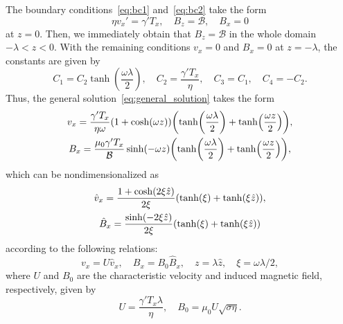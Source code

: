 \documentclass{article}
\begin{document}
The boundary conditions~\eqref{eq:bc1} and~\eqref{eq:bc2} take the form
\begin{equation}\label{eq:bc}
    \eta v_x' = \gamma'T_x, \quad B_z = \mathcal{B}, \quad B_x = 0
\end{equation}
at $z=0$.
Then, we immediately obtain that $B_z=\mathcal{B}$ in the whole domain $-\lambda<z<0$.
With the remaining conditions $v_x=0$ and $B_x=0$ at $z=-\lambda$,
the constants are given by
\begin{equation}\label{eq:constants}
    C_1 = C_2\tanh(\frac{\omega\lambda}2), \quad
    C_2 = \frac{\gamma'T_x}{\eta}, \quad
    C_3 = C_1, \quad C_4 = -C_2.
\end{equation}
Thus, the general solution~\eqref{eq:general_solution} takes the form
\begin{gather}
    v_x = \frac{\gamma'T_x}{\eta\omega}(1+\cosh(\omega z))
        \qty(\tanh(\frac{\omega\lambda}2) + \tanh(\frac{\omega z}2)), \label{eq:v_x}\\
    B_x = \frac{\mu_0\gamma'T_x}{\mathcal{B}}\sinh(-\omega z)
        \qty(\tanh(\frac{\omega\lambda}2) + \tanh(\frac{\omega z}2)), \label{eq:B_x}
\end{gather}
which can be nondimensionalized as
\begin{gather}
    \hat{v}_x = \frac{1+\cosh(2\xi\hat{z})}{2\xi}
        \qty( \tanh(\xi) + \tanh(\xi\hat{z}) ), \label{eq:hatv_x}\\
    \hat{B}_x = \frac{\sinh(-2\xi\hat{z})}{2\xi}
        \qty( \tanh(\xi) + \tanh(\xi\hat{z}) ) \label{eq:hatB_x}
\end{gather}
according to the following relations:
\begin{equation}\label{eq:nondimensioned}
    v_x = U \hat{v}_x, \quad B_x = B_0 \hat{B}_x, \quad
    z = \lambda \hat{z}, \quad \xi = \omega\lambda/2,
\end{equation}
where $U$ and $B_0$ are the characteristic velocity and induced magnetic field,
respectively, given by
\begin{equation}\label{eq:characteristic}
    U = \frac{\gamma'T_x\lambda}{\eta}, \quad
    B_0 = \mu_0U\sqrt{\sigma\eta}.
\end{equation}
\end{document}
